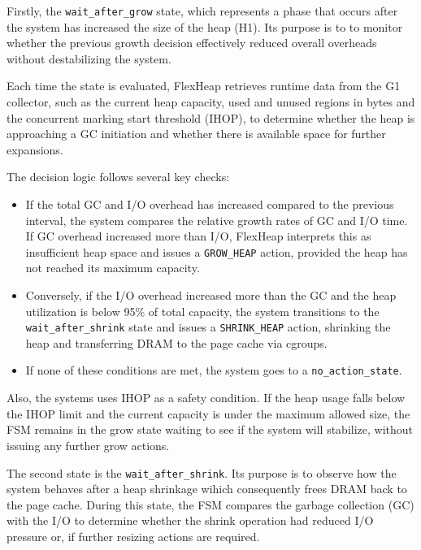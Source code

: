 Firstly, the \texttt{wait\_after\_grow} state, which represents a phase that occurs after
the system has increased the size of the heap (H1). Its purpose is to
to monitor whether the previous growth decision effectively
reduced overall overheads without destabilizing the system.

Each time the state is evaluated, FlexHeap retrieves runtime data from the G1 collector,
such as the current heap capacity, used and unused regions in bytes and the concurrent marking
start threshold (IHOP), to determine whether the heap is approaching
a GC initiation and whether there is available space for further expansions.

The decision logic follows several key checks:
\begin{itemize}
	\item If the total GC and I/O overhead has increased compared to the previous interval, the system
	      compares the relative growth rates of GC and I/O time. If GC overhead increased more than I/O,
	      FlexHeap interprets this as insufficient heap space and issues a \texttt{GROW\_HEAP} action,
	      provided the heap has not reached its maximum capacity.
	\item Conversely, if the I/O overhead increased more than the GC and the heap utilization is below 95\% of
	      total capacity, the system transitions to the \texttt{wait\_after\_shrink} state and issues a
	      \texttt{SHRINK\_HEAP} action, shrinking the heap and transferring DRAM to the page cache via cgroups.
	\item If none of these conditions are met, the system goes to a \texttt{no\_action\_state}.
\end{itemize}

Also, the systems uses IHOP as a safety condition. If the heap usage falls
below the IHOP limit and the current capacity is under the maximum allowed
size, the FSM remains in the grow state waiting to see if the system will
stabilize, without issuing any further grow actions.

The second state is the \texttt{wait\_after\_shrink}. Its purpose is to observe
how the system behaves after a heap shrinkage wihich consequently frees DRAM
back to the page cache. During this state, the FSM compares the garbage
collection (GC) with the I/O to determine whether the shrink operation had
reduced I/O pressure or, if further resizing actions are required.

